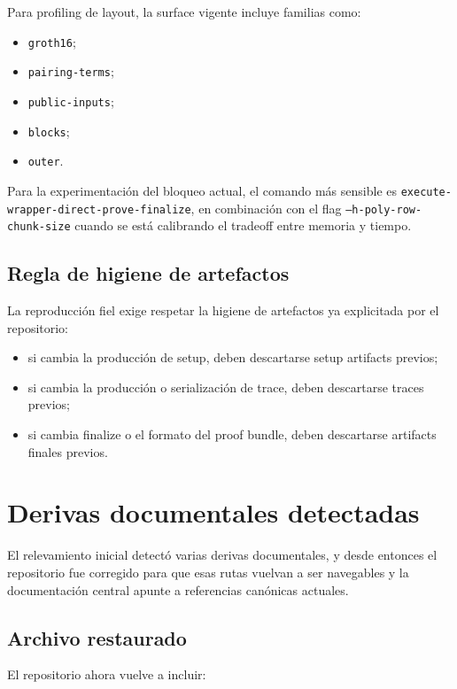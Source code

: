 \documentclass[11pt,a4paper]{article}
\begin{document}
Para profiling de layout, la surface vigente incluye familias como:

\begin{itemize}
  \item \texttt{groth16};
  \item \texttt{pairing-terms};
  \item \texttt{public-inputs};
  \item \texttt{blocks};
  \item \texttt{outer}.
\end{itemize}

Para la experimentaci\'on del bloqueo actual, el comando m\'as sensible es
\texttt{execute-wrapper-direct-prove-finalize}, en combinaci\'on con el flag
\texttt{--h-poly-row-chunk-size} cuando se est\'a calibrando el tradeoff entre memoria y tiempo.

\subsection{Regla de higiene de artefactos}

La reproducci\'on fiel exige respetar la higiene de artefactos ya explicitada por el repositorio:

\begin{itemize}
  \item si cambia la producci\'on de setup, deben descartarse setup artifacts previos;
  \item si cambia la producci\'on o serializaci\'on de trace, deben descartarse traces previos;
  \item si cambia finalize o el formato del proof bundle, deben descartarse artifacts finales previos.
\end{itemize}

\section{Derivas documentales detectadas}

El relevamiento inicial detect\'o varias derivas documentales, y desde entonces
el repositorio fue corregido para que esas rutas vuelvan a ser navegables y la
documentaci\'on central apunte a referencias can\'onicas actuales.

\subsection{Archivo restaurado}

El repositorio ahora vuelve a incluir:
\end{document}
